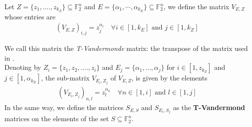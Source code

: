 \documentclass[11pt]{llncs}
\begin{document}
\begin{definition}\label{def:tVandermonde}
    Let $Z = \{z_1, ...., z_{k_Z}\} \subseteq \mathbb{F}_2^n$ and $E = \{\alpha_1, \cdots, \alpha_{k_E}\}\subseteq \mathbb{F}_2^n$, we define the matrix $V_{E,Z}$ whose entries are
    \begin{align*}
        \left(V_{E,Z}\right)_{i,j} = z_j^{\alpha_i} \quad \forall i\in[1,k_E] \mbox{ and } j\in[1, k_Z] 
    \end{align*}
    
    We call this matrix the \textit{T-Vandermonde} matrix: the transpose of the matrix used in \cite{armknecht2006efficient}.\\
    Denoting by $Z_i = \{z_1, z_2, ...., z_i\}$ and $E_j = \{\alpha_1, ..., \alpha_j\}$ for $i\in[1,z_{k_Z}]$ and $j\in[1,\alpha_{k_E}]$, the sub-matrix $V_{E_i, Z_j}$ of $V_{E,Z}$, is given by the elements
    \begin{align*}
        \left(V_{E_i,Z_j}\right)_{n,l} = z_l^{\alpha_n} \quad \forall n\in[1,i] \mbox{ and } l\in[1, j] 
    \end{align*}
    In the same way, we define the matrices $S_{E,S}$ and $S_{E_i, S_j}$ as the \textbf{T-Vandermond} matrices on the elements of the set $S\subseteq \mathbb{F}_2^n$.
\end{definition}
\end{document}
